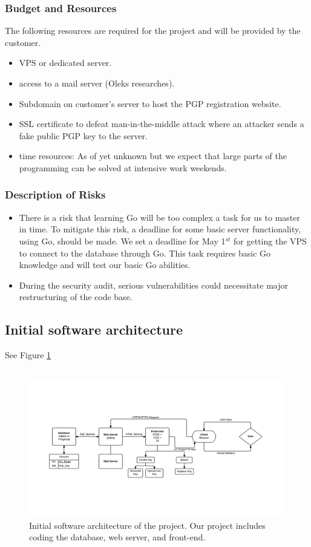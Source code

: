 \documentclass[11pt,a4paper]{article}
\begin{document}
\subsubsection{Budget and Resources}
The following resources are required for the project and will be provided by the customer.
\begin{itemize}
\item VPS or dedicated server.
\item access to a mail server (Oleks researches).
\item Subdomain on customer's server to host the PGP registration website.
\item SSL certificate to defeat man-in-the-middle attack where an attacker sends a fake public PGP key to the server.
\item time resources: As of yet unknown but we expect that large parts of the programming can be solved at intensive work weekends.
\end{itemize}
\subsubsection{Description of Risks}
\begin{itemize}
\item There is a risk that learning Go will be too complex a task for us to master in time. To mitigate this risk, a deadline for some basic server functionality, using Go, should be made. We set a deadline for May 1$^{st}$ for getting the VPS to connect to the database through Go. This task requires basic Go knowledge and will test our basic Go abilities.
\item During the security audit, serious vulnerabilities could necessitate major restructuring of the code base.
\end{itemize}
\newpage
\subsection{Initial software architecture}
See Figure \ref{fig:ISA} \\\\

\begin{figure}[h!]
\centering
\includegraphics[width=1.1\textwidth]{pictures/pksu_isa_centered}
\caption{Initial software architecture of the project. Our project includes coding the database, web server, and front-end.}
\label{fig:ISA}
\end{figure}
\end{document}
